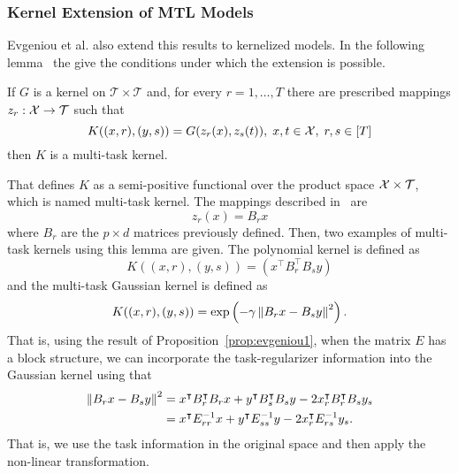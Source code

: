 \subsubsection*{Kernel Extension of MTL Models}
Evgeniou et al. also extend this results to kernelized models. In the following lemma~\cite[Lemma 2]{EvgeniouMP05} the give the conditions under which the extension is possible.

\begin{lemma}\label{lemma:evgeniou_2}
    If $G$ is a kernel on $\mathcal{T} \times \mathcal{T}$ and, for every $r=1, \ldots, T$ there are prescribed mappings
    $z_r: \mathcal{X} \to \mathcal{T}$
    such that
    \begin{equation}
        \label{eq:evgeniou_lemma2}
        K((x, r), (y, s)) = G(z_r(x), z_s(t)),\; x, t \in \Xspace,\; r,s \in [T]
    \end{equation}
    then $K$ is a multi-task kernel.
\end{lemma}
That defines $K$ as a semi-positive functional over the product space $\mathcal{X} \times \mathcal{T}$, which is named multi-task kernel.
The mappings described in~\cite{EvgeniouMP05} are
$$ z_r(x) = B_r x$$
where $B_r$ are the $p \times d$ matrices previously defined.
Then, two examples of multi-task kernels using this lemma are given. The polynomial kernel is defined as
$$ K((x, r), (y, s)) = \left( x^\intercal B_r^\intercal B_s y\right) $$
and the multi-task Gaussian kernel is defined as
$$ K((x, r), (y, s)) = \exp\left(-\gamma \left\lVert B_r x - B_s y\right\rVert^2 \right) .$$
That is, using the result of Proposition~\ref{prop:evgeniou1}, when the matrix $E$ has a block structure, we can incorporate the task-regularizer information into the Gaussian kernel using that
\begin{align*}
    \left\lVert B_r x - B_s y\right\rVert^2 
    &= x^\intercal B_r^\intercal B_r x + y^\intercal B_s^\intercal B_s y - 2 x_r^\intercal B_r^\intercal B_s y_s \\
    &= x^\intercal E_{rr}^{-1} x + y^\intercal E_{ss}^{-1} y - 2 x_r^\intercal E_{rs}^{-1} y_s .
\end{align*}
That is, we use the task information in the original space and then apply the non-linear transformation.
%

